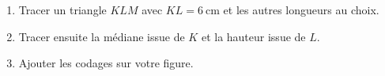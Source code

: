 
\begin{exercice}\label{exosmath-0978}
    \begin{enumerate}
        \item
    Tracer un triangle \( KLM\) avec \( KL=\SI{6}{\centi\meter}\) et les autres longueurs au choix.
\item
    Tracer ensuite la médiane issue de \( K\) et la hauteur issue de \( L\). 
\item
    Ajouter les codages sur votre figure.
    \end{enumerate}
\end{exercice}
